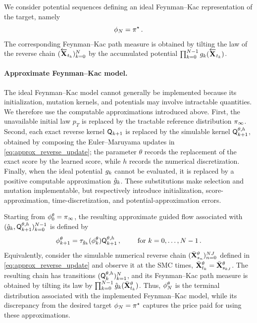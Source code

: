 \documentclass[11pt]{article}
\theoremstyle{plain}
\theoremstyle{definition}
\theoremstyle{remark}
\begin{document}
We consider potential sequences defining an ideal Feynman--Kac
representation of the target, namely
\begin{equation}
\label{eq:terminal_target}
\filter{N}=\pi^\star \eqsp.
\end{equation}
The corresponding Feynman--Kac path measure is obtained by tilting the
law of the reverse chain
$(\overleftarrow{\mathbf{X}}_{t_k})_{k=0}^{N}$
by the accumulated potential
$\prod_{k=0}^{N-1}\pot{k}(\Xola_{t_k})$.


\paragraph{Approximate Feynman--Kac model.}
The ideal Feynman--Kac model cannot generally be implemented because
its initialization, mutation kernels, and potentials may involve
intractable quantities. We therefore use the computable approximations
introduced above. First, the unavailable initial law $p_T$ is replaced
by the tractable reference distribution $\pi_{\infty}$. Second, each exact reverse kernel $\mk{k+1}$ is replaced by the simulable kernel
$\mk{k+1}[\theta,h]$, obtained by composing the Euler--Maruyama updates
in \eqref{eq:approx_reverse_update}; the parameter $\theta$ records the
replacement of the exact score by the learned score, while $h$ records
the numerical discretization. Finally, when the ideal potential
$\pot{k}$ cannot be evaluated, it is replaced by a positive computable
approximation $\approxpot{k}$. These substitutions make selection and
mutation implementable, but respectively introduce initialization,
score-approximation, time-discretization, and potential-approximation
errors.

Starting from $\approxfilter{0}=\refmeas$, the resulting approximate
guided flow associated with
$(\approxpot{k},\mk{k+1}[\theta,h])_{k=0}^{N-1}$ is defined by
\begin{equation}
    \label{eq:implemented_guided_flow}
    \approxfilter{k+1} = \tau_{\approxpot{k}}(\approxfilter{k}) \mk{k+1}[\theta,h] \eqsp,
    \qquad  \text{ for } k=0,\ldots,N-1 \eqsp.
\end{equation}
Equivalently, consider the simulable numerical reverse chain
$(\bar{\mathbf{X}}_{s_n}^{\theta})_{n=0}^{NJ}$ defined in
\eqref{eq:approx_reverse_update} and observe it at the SMC times,
$\bar{\mathbf{X}}_{t_k}^{\theta}=\bar{\mathbf{X}}_{s_{kJ}}^{\theta}$.
The resulting chain has transitions
$(\mk{k}[\theta,h])_{k=1}^N$, and its Feynman--Kac path measure is obtained
by tilting its law by
$\prod_{k=0}^{N-1}\approxpot{k}(\Xbar_{t_k}^{\theta})$. Thus, $\approxfilter{N}$ is the terminal distribution associated with the implemented Feynman--Kac model, while its discrepancy from the desired target $\filter{N}=\pi^\star$ captures the price paid for using these approximations.
%
\end{document}
